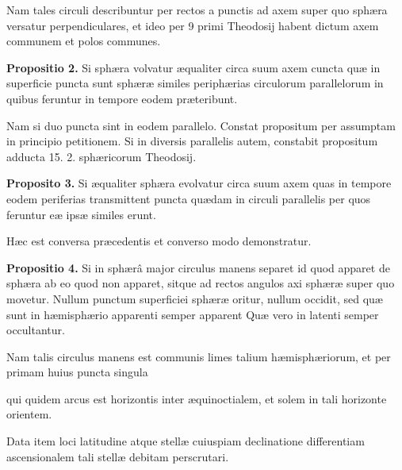 \documentclass[11pt,a4paper]{article}
\begin{document}
Nam tales circuli describuntur per rectos a punctis ad
axem super quo sphæra versatur perpendiculares, et
ideo per 9 primi Theodosij habent dictum axem communem
et polos communes.

\textbf{Propositio 2.} Si sphæra volvatur æqualiter circa suum axem
cuncta quæ in superficie puncta sunt sphæræ similes
periphærias circulorum parallelorum in quibus
feruntur in tempore eodem præteribunt.

Nam si duo puncta sint in eodem parallelo. Constat
propositum per assumptam in principio petitionem.
Si in diversis parallelis autem, constabit propositum
adducta 15. 2. sphæricorum Theodosij.

\textbf{Proposito 3.} Si æqualiter sphæra evolvatur circa suum axem
quas in tempore eodem periferias transmittent
puncta quædam in circuli parallelis per quos
feruntur eæ ipsæ similes erunt.

Hæc est conversa præcedentis et converso modo demonstratur.

\textbf{Propositio 4.} Si in sphærâ major circulus manens separet
id quod apparet de sphæra ab eo quod non
apparet, sitque ad rectos angulos axi sphæræ
super quo movetur. Nullum punctum superficiei
sphæræ oritur, nullum occidit, sed quæ sunt
in hæmisphærio apparenti semper apparent
Quæ vero in latenti semper occultantur.

Nam talis circulus manens est communis limes talium
hæmisphæriorum, et per primam huius puncta singula

qui quidem arcus est horizontis inter æquinoctialem, et solem
in tali horizonte orientem.

Data item loci latitudine atque stellæ cuiuspiam declinatione
differentiam ascensionalem tali stellæ debitam perscrutari.
\end{document}
